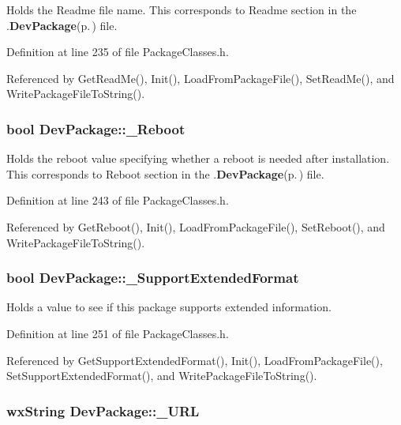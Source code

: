 Holds the Readme file name. This corresponds to Readme section in the .{\bf Dev\-Package}{\rm (p.\,\pageref{class_dev_package})} file. 

Definition at line 235 of file Package\-Classes.h.

Referenced by Get\-Read\-Me(), Init(), Load\-From\-Package\-File(), Set\-Read\-Me(), and Write\-Package\-File\-To\-String().
\subsubsection{\setlength{\rightskip}{0pt plus 5cm}bool {\bf Dev\-Package::\_\-Reboot}\hspace{0.3cm}{\tt  [private]}}\label{class_dev_package_739c412a153576999379b7fd4ba063de}


Holds the reboot value specifying whether a reboot is needed after installation. This corresponds to Reboot section in the .{\bf Dev\-Package}{\rm (p.\,\pageref{class_dev_package})} file. 

Definition at line 243 of file Package\-Classes.h.

Referenced by Get\-Reboot(), Init(), Load\-From\-Package\-File(), Set\-Reboot(), and Write\-Package\-File\-To\-String().
\subsubsection{\setlength{\rightskip}{0pt plus 5cm}bool {\bf Dev\-Package::\_\-Support\-Extended\-Format}\hspace{0.3cm}{\tt  [private]}}\label{class_dev_package_ca21679a1530c71a1b5fd3623b1fa2c4}


Holds a value to see if this package supports extended information. 

Definition at line 251 of file Package\-Classes.h.

Referenced by Get\-Support\-Extended\-Format(), Init(), Load\-From\-Package\-File(), Set\-Support\-Extended\-Format(), and Write\-Package\-File\-To\-String().
\subsubsection{\setlength{\rightskip}{0pt plus 5cm}wx\-String {\bf Dev\-Package::\_\-URL}\hspace{0.3cm}{\tt  [private]}}\label{class_dev_package_d514eae3e66fb4f616ebf0cf195093e0}


